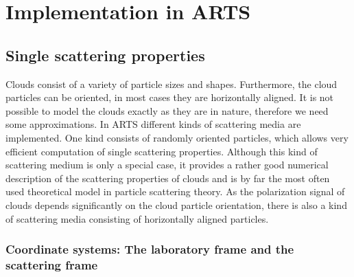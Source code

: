 \section{Implementation in ARTS}
\label{sec:scattering:implementation_DOIT}

\subsection[Single scattering properties]{Single scattering properties}
\label{sec:scattering:ssp}

Clouds consist of a variety of particle sizes and shapes. Furthermore,
the cloud particles
can be oriented, in most cases they are horizontally aligned.  It is
not possible to model the clouds exactly as they are in nature,
therefore we need some approximations.  In ARTS different kinds of
scattering media are implemented. One kind consists of randomly
oriented particles, which allows very efficient computation of single
scattering properties.  Although this kind of scattering medium is
only a special case, it provides a rather good numerical description
of the scattering properties of clouds and is by far the most often
used theoretical model in particle scattering theory.  As the
polarization signal of clouds depends significantly on the cloud
particle orientation, there is also a kind of
scattering media consisting of horizontally aligned particles.

\subsubsection[Coordinate systems]{Coordinate systems: The laboratory frame and the scattering frame}
\label{sec:scattering:coordinate_sytems}

